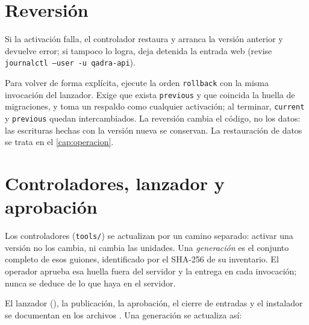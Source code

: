 
\section{Reversión}\label{sec:desp-reversion}

Si la activación falla, el controlador restaura y arranca la versión
anterior y devuelve error; si tampoco lo logra, deja detenida la entrada web
(revise \texttt{journalctl --user -u qadra-api}).

Para volver de forma explícita, ejecute la orden \texttt{rollback} con la
misma invocación del lanzador. Exige que exista \texttt{previous} y que
coincida la huella de migraciones, y toma un respaldo como cualquier
activación; al terminar, \texttt{current} y \texttt{previous} quedan intercambiados. La reversión cambia el código, no
los datos: las escrituras hechas con la versión nueva se conservan. La
restauración de datos se trata en el \cref{cap:operacion}.

\section{Controladores, lanzador y aprobación}\label{sec:desp-controladores}

Los controladores (\texttt{tools/}) se actualizan por un camino separado:
activar una versión no los cambia, ni cambia las unidades. Una
\emph{generación} es el conjunto completo de esos guiones, identificado por
el SHA-256 de su inventario. El operador aprueba esa huella fuera del
servidor y la entrega en cada invocación; nunca se deduce de lo que haya en
el servidor.

El lanzador (), la publicación, la
aprobación, el cierre de entradas y el instalador se documentan en los
archivos . Una generación se
actualiza así:

